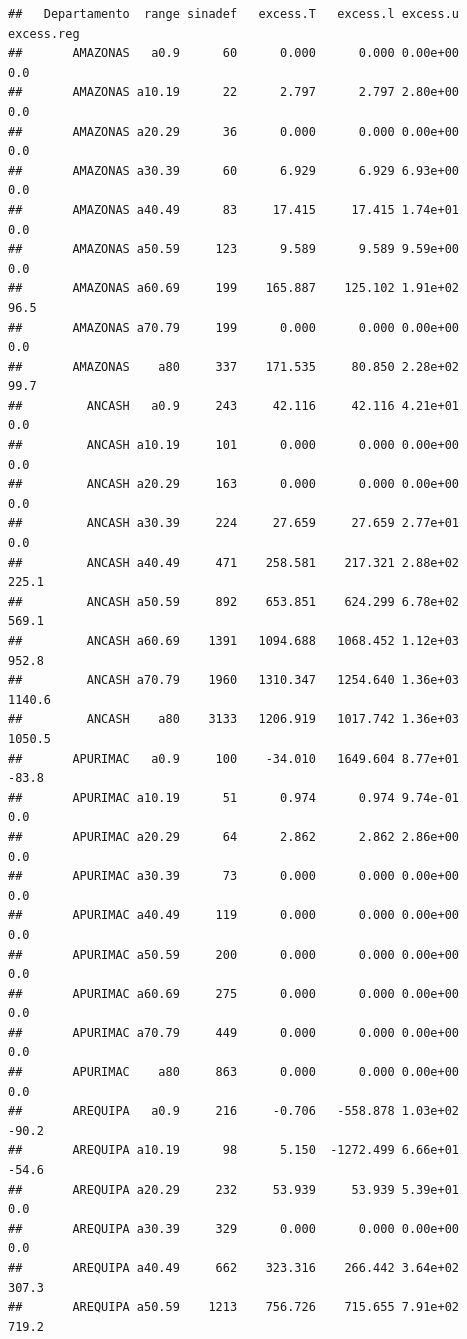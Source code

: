 \documentclass[
]{article}
\begin{document}
\begin{verbatim}
##   Departamento  range sinadef   excess.T   excess.l excess.u excess.reg
##       AMAZONAS   a0.9      60      0.000      0.000 0.00e+00        0.0
##       AMAZONAS a10.19      22      2.797      2.797 2.80e+00        0.0
##       AMAZONAS a20.29      36      0.000      0.000 0.00e+00        0.0
##       AMAZONAS a30.39      60      6.929      6.929 6.93e+00        0.0
##       AMAZONAS a40.49      83     17.415     17.415 1.74e+01        0.0
##       AMAZONAS a50.59     123      9.589      9.589 9.59e+00        0.0
##       AMAZONAS a60.69     199    165.887    125.102 1.91e+02       96.5
##       AMAZONAS a70.79     199      0.000      0.000 0.00e+00        0.0
##       AMAZONAS    a80     337    171.535     80.850 2.28e+02       99.7
##         ANCASH   a0.9     243     42.116     42.116 4.21e+01        0.0
##         ANCASH a10.19     101      0.000      0.000 0.00e+00        0.0
##         ANCASH a20.29     163      0.000      0.000 0.00e+00        0.0
##         ANCASH a30.39     224     27.659     27.659 2.77e+01        0.0
##         ANCASH a40.49     471    258.581    217.321 2.88e+02      225.1
##         ANCASH a50.59     892    653.851    624.299 6.78e+02      569.1
##         ANCASH a60.69    1391   1094.688   1068.452 1.12e+03      952.8
##         ANCASH a70.79    1960   1310.347   1254.640 1.36e+03     1140.6
##         ANCASH    a80    3133   1206.919   1017.742 1.36e+03     1050.5
##       APURIMAC   a0.9     100    -34.010   1649.604 8.77e+01      -83.8
##       APURIMAC a10.19      51      0.974      0.974 9.74e-01        0.0
##       APURIMAC a20.29      64      2.862      2.862 2.86e+00        0.0
##       APURIMAC a30.39      73      0.000      0.000 0.00e+00        0.0
##       APURIMAC a40.49     119      0.000      0.000 0.00e+00        0.0
##       APURIMAC a50.59     200      0.000      0.000 0.00e+00        0.0
##       APURIMAC a60.69     275      0.000      0.000 0.00e+00        0.0
##       APURIMAC a70.79     449      0.000      0.000 0.00e+00        0.0
##       APURIMAC    a80     863      0.000      0.000 0.00e+00        0.0
##       AREQUIPA   a0.9     216     -0.706   -558.878 1.03e+02      -90.2
##       AREQUIPA a10.19      98      5.150  -1272.499 6.66e+01      -54.6
##       AREQUIPA a20.29     232     53.939     53.939 5.39e+01        0.0
##       AREQUIPA a30.39     329      0.000      0.000 0.00e+00        0.0
##       AREQUIPA a40.49     662    323.316    266.442 3.64e+02      307.3
##       AREQUIPA a50.59    1213    756.726    715.655 7.91e+02      719.2

\end{verbatim}
\end{document}
